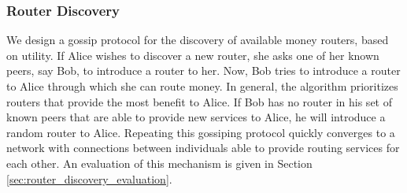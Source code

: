 \subsubsection*{Router Discovery}
\label{sec:peer_discovery}
We design a gossip protocol for the discovery of available money routers, based on utility.
If Alice wishes to discover a new router, she asks one of her known peers, say Bob, to introduce a router to her.
Now, Bob tries to introduce a router to Alice through which she can route money. %
In general, the algorithm prioritizes routers that provide the most benefit to Alice.
If Bob has no router in his set of known peers that are able to provide new services to Alice, he will introduce a random router to Alice.
Repeating this gossiping protocol quickly converges to a network with connections between individuals able to provide routing services for each other.
An evaluation of this mechanism is given in Section \ref{sec:router_discovery_evaluation}.

